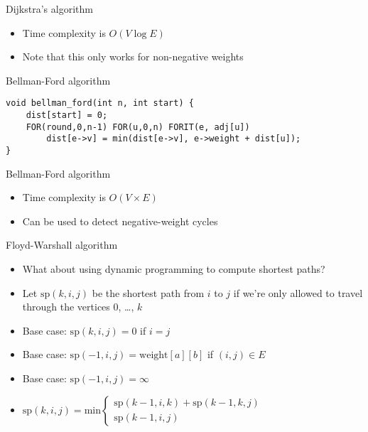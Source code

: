 \documentclass[12pt,t]{beamer}
\newcommand{\bi}{\begin{itemize}}
\newcommand{\ei}{\end{itemize}}
\begin{document}
\begin{frame}{Dijkstra's algorithm}
    \vspace{50pt}
    \bi
        \item Time complexity is $O(V \log E)$
        \vspace{10pt}
        \item Note that this only works for non-negative weights
    \ei
\end{frame}

\begin{frame}[fragile]{Bellman-Ford algorithm}
    \begin{verbatim}
void bellman_ford(int n, int start) {
    dist[start] = 0;
    FOR(round,0,n-1) FOR(u,0,n) FORIT(e, adj[u])
        dist[e->v] = min(dist[e->v], e->weight + dist[u]);
}
    \end{verbatim}
\end{frame}

\begin{frame}{Bellman-Ford algorithm}
    \vspace{50pt}
    \bi
        \item Time complexity is $O(V\times E)$
        \vspace{10pt}
        \item Can be used to detect negative-weight cycles
    \ei
\end{frame}

\begin{frame}{Floyd-Warshall algorithm}
    \vspace{20pt}
    \bi
        \item What about using dynamic programming to compute shortest paths?
        \vspace{10pt}
    \item Let $\mathrm{sp}(k, i, j)$ be the shortest path from $i$ to $j$ if we're only allowed to travel through the vertices $0$, \ldots, $k$
        \vspace{5pt}
    \item Base case: $\mathrm{sp}(k, i, j) = 0$ if $i = j$
    \item Base case: $\mathrm{sp}(-1, i, j) = \mathrm{weight}[a][b]$ if $(i,j) \in E$
    \item Base case: $\mathrm{sp}(-1, i, j) = \infty$
        \vspace{5pt}
    \item $\mathrm{sp}(k, i, j) = \mathrm{min} \left\{
	\begin{array}{l}
        \mathrm{sp}(k - 1, i, k) + \mathrm{sp}(k - 1, k, j) \\
        \mathrm{sp}(k - 1, i, j)
	\end{array}
\right.$
    \ei
\end{frame}
\end{document}
